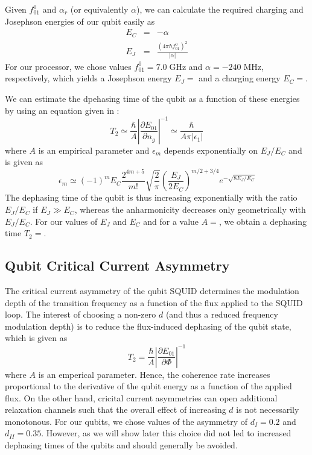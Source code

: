 \smallskip

Given $f_{01}^0$ and $\alpha_r$ (or equivalently $\alpha$), we can calculate the required charging and Josephson energies of our qubit easily as
%
\begin{eqnarray}
E_C & = & -\alpha \\
E_J & = & \frac{(4\pi\hbar f_{01}^0)^2}{|\alpha|}
\end{eqnarray}
%
For our processor, we chose values $f_{01}^0=7.0\;\mathrm{GHz}$ and $\alpha=-240\;\mathrm{MHz}$, respectively, which yields a Josephson energy $E_J=$ and a charging energy $E_C=$.

\smallskip

We can estimate the dpehasing time of the qubit as a function of these energies by using an equation given in \cite{koch_charge-insensitive_2007}:
%
\begin{equation}
T_2 \simeq \frac{\hbar}{A}\left|\frac{\partial E_{01}}{\partial n_g}\right|^{-1} \simeq \frac{\hbar}{A\pi |\epsilon_1|}
\end{equation}
%
where $A$ is an empirical parameter and $\epsilon_m$ depends exponentially on $E_J/E_C$ and is given as
%
\begin{equation}
\epsilon_m \simeq (-1)^m E_C \frac{2^{4m+5}}{m!}\sqrt{\frac{2}{\pi}}\left(\frac{E_J}{2E_C}\right)^{m/2+3/4}e^{-\sqrt{8 E_J / E_C}}
\end{equation}
%
The dephasing time of the qubit is thus increasing exponentially with the ratio $E_J/E_C$ if $E_J \gg E_C$, whereas the anharmonicity decreases only geometrically with $E_J/E_C$. For our values of $E_J$ and $E_C$ and for a value $A=$, we obtain a dephasing time $T_2=$.

\subsection{Qubit Critical Current Asymmetry}

The critical current asymmetry of the qubit SQUID determines the modulation depth of the transition frequency as a function of the flux applied to the SQUID loop. The interest of choosing a non-zero $d$ (and thus a reduced frequency modulation depth) is to reduce the flux-induced dephasing of the qubit state, which is given as \citep{koch_charge-insensitive_2007}
%
\begin{equation}
T_2 = \frac{\hbar}{A}\left|\frac{\partial E_{01}}{\partial \Phi}\right|^{-1}
\end{equation}
%
where $A$ is an emperical parameter. Hence, the coherence rate increases proportional to the derivative of the qubit energy as a function of the applied flux. On the other hand, cricital current asymmetries can open additional relaxation channels \citep{} such that the overall effect of increasing $d$ is not necessarily monotonous. For our qubits, we chose values of the asymmetry of $d_{I}=0.2$ and $d_{II}=0.35$. However, as we will show later this choice did not led to increased dephasing times of the qubits and should generally be avoided.

